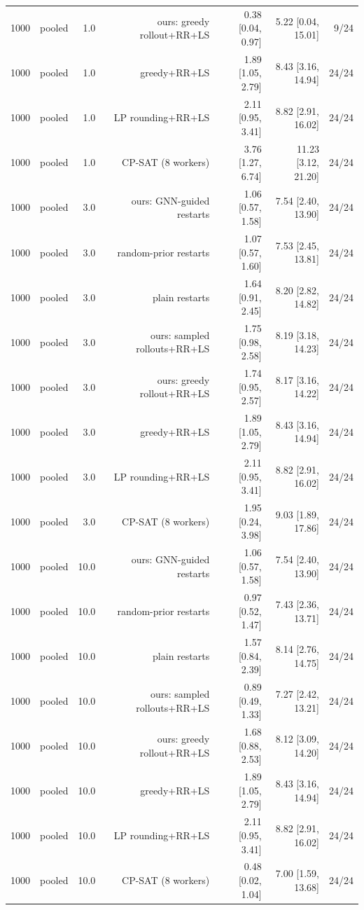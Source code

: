 \begin{table}[t]
\begin{tabular}{llrrrrr}
1000 & pooled & 1.0 & ours: greedy rollout+RR+LS & 0.38 [0.04, 0.97] & 5.22 [0.04, 15.01] & 9/24 \\
1000 & pooled & 1.0 & greedy+RR+LS & 1.89 [1.05, 2.79] & 8.43 [3.16, 14.94] & 24/24 \\
1000 & pooled & 1.0 & LP rounding+RR+LS & 2.11 [0.95, 3.41] & 8.82 [2.91, 16.02] & 24/24 \\
1000 & pooled & 1.0 & CP-SAT (8 workers) & 3.76 [1.27, 6.74] & 11.23 [3.12, 21.20] & 24/24 \\
1000 & pooled & 3.0 & ours: GNN-guided restarts & 1.06 [0.57, 1.58] & 7.54 [2.40, 13.90] & 24/24 \\
1000 & pooled & 3.0 & random-prior restarts & 1.07 [0.57, 1.60] & 7.53 [2.45, 13.81] & 24/24 \\
1000 & pooled & 3.0 & plain restarts & 1.64 [0.91, 2.45] & 8.20 [2.82, 14.82] & 24/24 \\
1000 & pooled & 3.0 & ours: sampled rollouts+RR+LS & 1.75 [0.98, 2.58] & 8.19 [3.18, 14.23] & 24/24 \\
1000 & pooled & 3.0 & ours: greedy rollout+RR+LS & 1.74 [0.95, 2.57] & 8.17 [3.16, 14.22] & 24/24 \\
1000 & pooled & 3.0 & greedy+RR+LS & 1.89 [1.05, 2.79] & 8.43 [3.16, 14.94] & 24/24 \\
1000 & pooled & 3.0 & LP rounding+RR+LS & 2.11 [0.95, 3.41] & 8.82 [2.91, 16.02] & 24/24 \\
1000 & pooled & 3.0 & CP-SAT (8 workers) & 1.95 [0.24, 3.98] & 9.03 [1.89, 17.86] & 24/24 \\
1000 & pooled & 10.0 & ours: GNN-guided restarts & 1.06 [0.57, 1.58] & 7.54 [2.40, 13.90] & 24/24 \\
1000 & pooled & 10.0 & random-prior restarts & 0.97 [0.52, 1.47] & 7.43 [2.36, 13.71] & 24/24 \\
1000 & pooled & 10.0 & plain restarts & 1.57 [0.84, 2.39] & 8.14 [2.76, 14.75] & 24/24 \\
1000 & pooled & 10.0 & ours: sampled rollouts+RR+LS & 0.89 [0.49, 1.33] & 7.27 [2.42, 13.21] & 24/24 \\
1000 & pooled & 10.0 & ours: greedy rollout+RR+LS & 1.68 [0.88, 2.53] & 8.12 [3.09, 14.20] & 24/24 \\
1000 & pooled & 10.0 & greedy+RR+LS & 1.89 [1.05, 2.79] & 8.43 [3.16, 14.94] & 24/24 \\
1000 & pooled & 10.0 & LP rounding+RR+LS & 2.11 [0.95, 3.41] & 8.82 [2.91, 16.02] & 24/24 \\
1000 & pooled & 10.0 & CP-SAT (8 workers) & 0.48 [0.02, 1.04] & 7.00 [1.59, 13.68] & 24/24 \\

\end{tabular}
\end{table}
